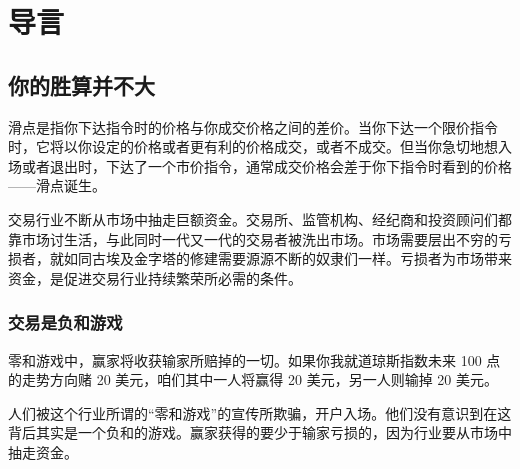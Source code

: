 \chapter{导言}
\section{你的胜算并不大}
滑点是指你下达指令时的价格与你成交价格之间的差价。当你下达一个限价指令时，它将以你设定的价格或者更有利的价格成交，或者不成交。但当你急切地想入场或者退出时，下达了一个市价指令，通常成交价格会差于你下指令时看到的价格——滑点诞生。

交易行业不断从市场中抽走巨额资金。交易所、监管机构、经纪商和投资顾问们都靠市场讨生活，与此同时一代又一代的交易者被洗出市场。市场需要层出不穷的亏损者，就如同古埃及金字塔的修建需要源源不断的奴隶们一样。亏损者为市场带来资金，是促进交易行业持续繁荣所必需的条件。
\subsection*{交易是负和游戏}
零和游戏中，赢家将收获输家所赔掉的一切。如果你我就道琼斯指数未来 100 点的走势方向赌 20 美元，咱们其中一人将赢得 20 美元，另一人则输掉 20 美元。

人们被这个行业所谓的“零和游戏”的宣传所欺骗，开户入场。他们没有意识到在这背后其实是一个负和的游戏。赢家获得的要少于输家亏损的，因为行业要从市场中抽走资金。